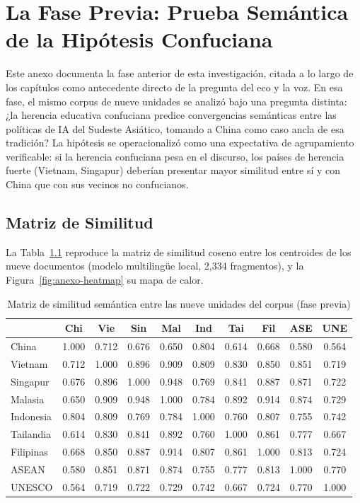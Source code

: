 \chapter{La Fase Previa: Prueba Semántica de la Hipótesis Confuciana}
\label{anexo:fase-previa}

Este anexo documenta la fase anterior de esta investigación, citada a lo largo de los capítulos como antecedente directo de la pregunta del eco y la voz. En esa fase, el mismo corpus de nueve unidades se analizó bajo una pregunta distinta: ¿la herencia educativa confuciana predice convergencias semánticas entre las políticas de IA del Sudeste Asiático, tomando a China como caso ancla de esa tradición? La hipótesis se operacionalizó como una expectativa de agrupamiento verificable: si la herencia confuciana pesa en el discurso, los países de herencia fuerte (Vietnam, Singapur) deberían presentar mayor similitud entre sí y con China que con sus vecinos no confucianos.

\section{Matriz de Similitud}

La Tabla~\ref{tab:anexo-similitud} reproduce la matriz de similitud coseno entre los centroides de los nueve documentos (modelo multilingüe local, 2{,}334 fragmentos), y la Figura~\ref{fig:anexo-heatmap} su mapa de calor.

\begin{table}[htbp]
\centering
\caption{Matriz de similitud semántica entre las nueve unidades del corpus (fase previa)}
\label{tab:anexo-similitud}
\footnotesize
\begin{tabular}{lccccccccc}
\hline
 & \textbf{Chi} & \textbf{Vie} & \textbf{Sin} & \textbf{Mal} & \textbf{Ind} & \textbf{Tai} & \textbf{Fil} & \textbf{ASE} & \textbf{UNE} \\
\hline
China      & 1.000 & 0.712 & 0.676 & 0.650 & 0.804 & 0.614 & 0.668 & 0.580 & 0.564 \\
Vietnam    & 0.712 & 1.000 & 0.896 & 0.909 & 0.809 & 0.830 & 0.850 & 0.851 & 0.719 \\
Singapur   & 0.676 & 0.896 & 1.000 & 0.948 & 0.769 & 0.841 & 0.887 & 0.871 & 0.722 \\
Malasia    & 0.650 & 0.909 & 0.948 & 1.000 & 0.784 & 0.892 & 0.914 & 0.874 & 0.729 \\
Indonesia  & 0.804 & 0.809 & 0.769 & 0.784 & 1.000 & 0.760 & 0.807 & 0.755 & 0.742 \\
Tailandia  & 0.614 & 0.830 & 0.841 & 0.892 & 0.760 & 1.000 & 0.861 & 0.777 & 0.667 \\
Filipinas  & 0.668 & 0.850 & 0.887 & 0.914 & 0.807 & 0.861 & 1.000 & 0.813 & 0.724 \\
ASEAN      & 0.580 & 0.851 & 0.871 & 0.874 & 0.755 & 0.777 & 0.813 & 1.000 & 0.770 \\
UNESCO     & 0.564 & 0.719 & 0.722 & 0.729 & 0.742 & 0.667 & 0.724 & 0.770 & 1.000 \\
\hline
\end{tabular}
\end{table}

